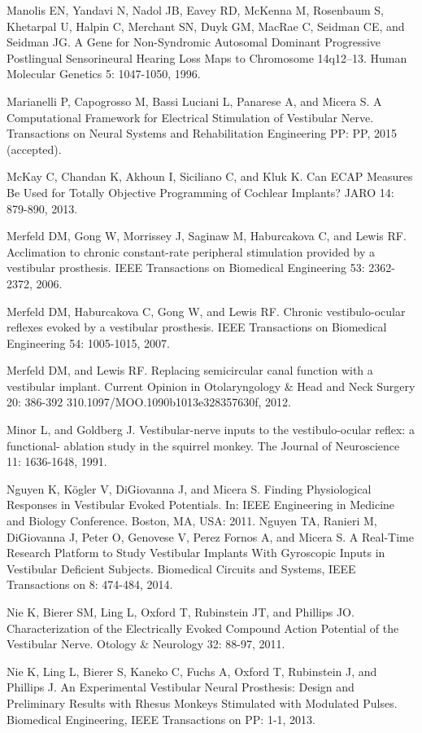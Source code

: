 {Manolis EN, Yandavi N, Nadol JB, Eavey RD, McKenna M, Rosenbaum S, Khetarpal U, Halpin C, Merchant SN, Duyk GM, MacRae C, Seidman CE, and Seidman JG. A Gene for Non-Syndromic Autosomal Dominant Progressive Postlingual Sensorineural Hearing Loss Maps to Chromosome 14q12–13. Human Molecular Genetics 5: 1047-1050, 1996.

Marianelli P, Capogrosso M, Bassi Luciani L, Panarese A, and Micera S. A Computational Framework for Electrical Stimulation of Vestibular Nerve. Transactions on Neural Systems and Rehabilitation Engineering PP: PP, 2015 (accepted).

McKay C, Chandan K, Akhoun I, Siciliano C, and Kluk K. Can ECAP Measures Be Used for Totally Objective Programming of Cochlear Implants? JARO 14: 879-890, 2013.

Merfeld DM, Gong W, Morrissey J, Saginaw M, Haburcakova C, and Lewis RF. Acclimation to chronic constant-rate peripheral stimulation provided by a vestibular prosthesis. IEEE Transactions on Biomedical Engineering 53: 2362-2372, 2006.

Merfeld DM, Haburcakova C, Gong W, and Lewis RF. Chronic vestibulo-ocular reflexes evoked by a vestibular prosthesis. IEEE Transactions on Biomedical Engineering 54: 1005-1015, 2007.

Merfeld DM, and Lewis RF. Replacing semicircular canal function with a vestibular implant. Current Opinion in Otolaryngology \& Head and Neck Surgery 20: 386-392 310.1097/MOO.1090b1013e328357630f, 2012.

Minor L, and Goldberg J. Vestibular-nerve inputs to the vestibulo-ocular reflex: a functional- ablation study in the squirrel monkey. The Journal of Neuroscience 11: 1636-1648, 1991.

Nguyen K, Kögler V, DiGiovanna J, and Micera S. Finding Physiological Responses in Vestibular Evoked Potentials. In: IEEE Engineering in Medicine and Biology Conference. Boston, MA, USA: 2011.
Nguyen TA, Ranieri M, DiGiovanna J, Peter O, Genovese V, Perez Fornos A, and Micera S. A Real-Time Research Platform to Study Vestibular Implants With Gyroscopic Inputs in Vestibular Deficient Subjects. Biomedical Circuits and Systems, IEEE Transactions on 8: 474-484, 2014.

Nie K, Bierer SM, Ling L, Oxford T, Rubinstein JT, and Phillips JO. Characterization of the Electrically Evoked Compound Action Potential of the Vestibular Nerve. Otology \& Neurology 32: 88-97, 2011.

Nie K, Ling L, Bierer S, Kaneko C, Fuchs A, Oxford T, Rubinstein J, and Phillips J. An Experimental Vestibular Neural Prosthesis: Design and Preliminary Results with Rhesus Monkeys Stimulated with Modulated Pulses. Biomedical Engineering, IEEE Transactions on PP: 1-1, 2013.

}
